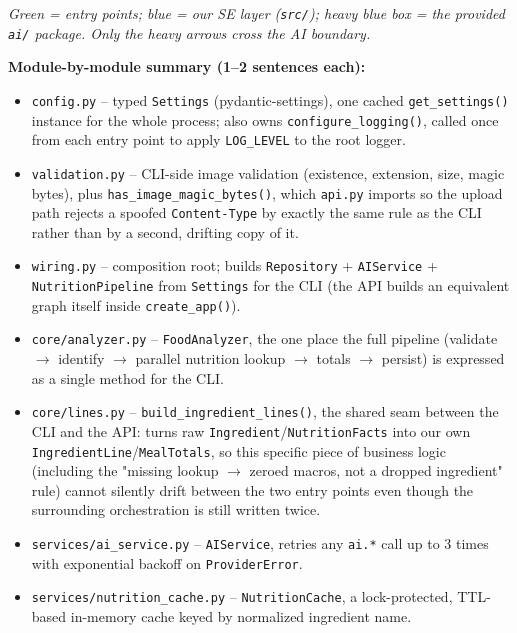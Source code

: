 \documentclass[11pt,a4paper]{article}
\newcommand{\phh}[1]{\textcolor{ph}{\textit{#1}}}
\begin{document}
\begin{center}
\phh{Green = entry points; blue = our SE layer (\texttt{src/}); heavy blue box = the
provided \texttt{ai/} package. Only the heavy arrows cross the AI boundary.}
\end{center}

\textbf{Module-by-module summary (1--2 sentences each):}

\begin{itemize}[leftmargin=1.4em,itemsep=1pt]
  \item \texttt{config.py} -- typed \texttt{Settings} (pydantic-settings), one cached \texttt{get\_settings()} instance for the whole process; also owns \texttt{configure\_logging()}, called once from each entry point to apply \texttt{LOG\_LEVEL} to the root logger.
  \item \texttt{validation.py} -- CLI-side image validation (existence, extension, size, magic bytes), plus \texttt{has\_image\_magic\_bytes()}, which \texttt{api.py} imports so the upload path rejects a spoofed \texttt{Content-Type} by exactly the same rule as the CLI rather than by a second, drifting copy of it.
  \item \texttt{wiring.py} -- composition root; builds \texttt{Repository} + \texttt{AIService} + \texttt{NutritionPipeline} from \texttt{Settings} for the CLI (the API builds an equivalent graph itself inside \texttt{create\_app()}).
  \item \texttt{core/analyzer.py} -- \texttt{FoodAnalyzer}, the one place the full pipeline (validate $\to$ identify $\to$ parallel nutrition lookup $\to$ totals $\to$ persist) is expressed as a single method for the CLI.
  \item \texttt{core/lines.py} -- \texttt{build\_ingredient\_lines()}, the shared seam between the CLI and the API: turns raw \texttt{Ingredient}/\texttt{NutritionFacts} into our own \texttt{IngredientLine}/\texttt{MealTotals}, so this specific piece of business logic (including the "missing lookup $\to$ zeroed macros, not a dropped ingredient" rule) cannot silently drift between the two entry points even though the surrounding orchestration is still written twice.
  \item \texttt{services/ai\_service.py} -- \texttt{AIService}, retries any \texttt{ai.*} call up to 3 times with exponential backoff on \texttt{ProviderError}.
  \item \texttt{services/nutrition\_cache.py} -- \texttt{NutritionCache}, a lock-protected, TTL-based in-memory cache keyed by normalized ingredient name.

\end{itemize}
\end{document}
